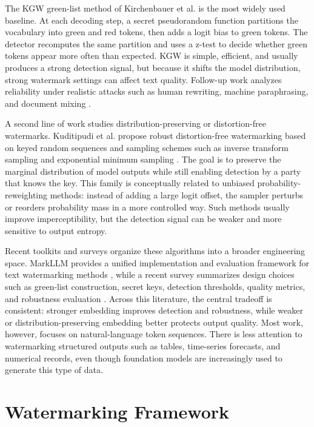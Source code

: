 \documentclass[11pt]{article}
\begin{document}
The KGW green-list method of Kirchenbauer et al. \cite{kirchenbauer2023} is the most widely used baseline.
At each decoding step, a secret pseudorandom function partitions the vocabulary into green and red tokens, then adds a logit bias to green tokens.
The detector recomputes the same partition and uses a z-test to decide whether green tokens appear more often than expected.
KGW is simple, efficient, and usually produces a strong detection signal, but because it shifts the model distribution, strong watermark settings can affect text quality.
Follow-up work analyzes reliability under realistic attacks such as human rewriting, machine paraphrasing, and document mixing \cite{kirchenbauer_reliability2023}.

A second line of work studies distribution-preserving or distortion-free watermarks.
Kuditipudi et al. propose robust distortion-free watermarking based on keyed random sequences and sampling schemes such as inverse transform sampling and exponential minimum sampling \cite{kuditipudi2023}.
The goal is to preserve the marginal distribution of model outputs while still enabling detection by a party that knows the key.
This family is conceptually related to unbiased probability-reweighting methods: instead of adding a large logit offset, the sampler perturbs or reorders probability mass in a more controlled way.
Such methods usually improve imperceptibility, but the detection signal can be weaker and more sensitive to output entropy.

Recent toolkits and surveys organize these algorithms into a broader engineering space.
MarkLLM provides a unified implementation and evaluation framework for text watermarking methods \cite{markllm2024}, while a recent survey summarizes design choices such as green-list construction, secret keys, detection thresholds, quality metrics, and robustness evaluation \cite{survey2024}.
Across this literature, the central tradeoff is consistent: stronger embedding improves detection and robustness, while weaker or distribution-preserving embedding better protects output quality.
Most work, however, focuses on natural-language token sequences.
There is less attention to watermarking structured outputs such as tables, time-series forecasts, and numerical records, even though foundation models are increasingly used to generate this type of data.

\section{Watermarking Framework}
\end{document}
